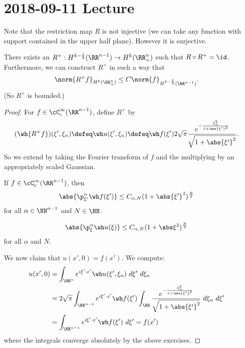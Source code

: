 \section{2018-09-11 Lecture}

Note that the restriction map $R$ is not injective (we can take any function with support contained in the upper half plane).
However it is surjective.

\begin{prop}
  There exists an $R^+: H^{k-\frac12}(\RR^{n-1}) \to H^k(\RR^n_+)$ such that $R \circ R^+ = \id$.
  Furthermore, we can construct $R^+$ in such a way that
  \[ \norm{R^+f}_{H^k(\RR_+^n)} \leq C\norm{f}_{H^{k-\frac12}(\RR^{n-1})}. \]
  (So $R^+$ is bounded.)
\end{prop}

\begin{proof}
  For $f\in\cC_c^\infty(\RR^{n-1})$, define $R^+$ by
  \[ (\wh{R^+f})(\xi',\xi_n) \defeq \wh u(\xi',\xi_n) \defeq \wh f(\xi') 2\sqrt\pi \frac{e^{-\frac{\xi_n^2}{1+\abs{\xi'}^2}}}{\sqrt{1+\abs{\xi'}^2}}. \]
  So we extend by taking the Fourier transform of $f$ and the multiplying by an appropriately scaled Gaussian.

  \begin{exer}
    If $f\in\cC_c^\infty(\RR^{n-1})$, then
    \[ \abs{\p_{\xi'}^\alpha \wh f(\xi')} \leq C_{\alpha,N} (1+\abs{\xi'}^2)^\frac N2 \]
    for all $\alpha\in\NN^{n-1}$ and $N\in\NN$.
  \end{exer}

  \begin{exer}
    \[ \abs{\p_\xi^\alpha \wh u(\xi)} \leq C_{\alpha,N} (1+\abs\xi^2)^\frac N2 \]
    for all $\alpha$ and $N$.
  \end{exer}

  We now claim that $u(x',0)=f(x')$.
  We compute:
  \begin{align*}
    u(x',0) &= \int_{\RR^n} e^{i\xi'\cdot x'} \wh u(\xi',\xi_n) \ d\xi' \ d\xi_n \\
    &= 2\sqrt\pi \int_{\RR^{n-1}} e^{i\xi'\cdot x'} \wh f(\xi') \int_\RR \frac{e^{-\frac{\xi_n^2}{1+\abs{\xi'}^2}}}{\sqrt{1+\abs{\xi'}^2}} \ d\xi_n \ d\xi' \\
    &= \int_{\RR^{n-1}} e^{i\xi'\cdot x'} \wh f(\xi') \ d\xi' = f(x')
  \end{align*}
  where the integrals converge absolutely by the above exercises.


\end{proof}
